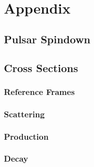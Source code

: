 \chapter*{Appendix}
\label{ch:appendix}

\section{Pulsar Spindown}

\section{Cross Sections}

\subsection*{Reference Frames}

\subsection*{Scattering}

\autocite{Fagundes_2012}

\subsection*{Production}

\subsection*{Decay}
